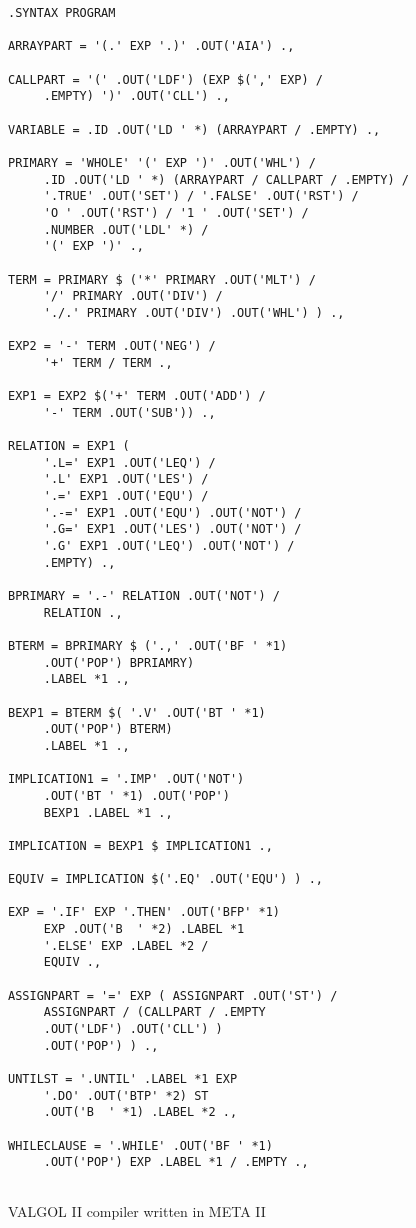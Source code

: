 \documentclass[notitlepage,twocolumn]{report}
\begin{document}
\begin{figure}
\caption{VALGOL II compiler written in META II}
\begin{verbatim}
.SYNTAX PROGRAM

ARRAYPART = '(.' EXP '.)' .OUT('AIA') .,

CALLPART = '(' .OUT('LDF') (EXP $(',' EXP) /
     .EMPTY) ')' .OUT('CLL') .,

VARIABLE = .ID .OUT('LD ' *) (ARRAYPART / .EMPTY) .,

PRIMARY = 'WHOLE' '(' EXP ')' .OUT('WHL') /
     .ID .OUT('LD ' *) (ARRAYPART / CALLPART / .EMPTY) /
     '.TRUE' .OUT('SET') / '.FALSE' .OUT('RST') /
     'O ' .OUT('RST') / '1 ' .OUT('SET') /
     .NUMBER .OUT('LDL' *) /
     '(' EXP ')' .,

TERM = PRIMARY $ ('*' PRIMARY .OUT('MLT') /
     '/' PRIMARY .OUT('DIV') /
     './.' PRIMARY .OUT('DIV') .OUT('WHL') ) .,

EXP2 = '-' TERM .OUT('NEG') /
     '+' TERM / TERM .,

EXP1 = EXP2 $('+' TERM .OUT('ADD') /
     '-' TERM .OUT('SUB')) .,

RELATION = EXP1 (
     '.L=' EXP1 .OUT('LEQ') /
     '.L' EXP1 .OUT('LES') /
     '.=' EXP1 .OUT('EQU') /
     '.-=' EXP1 .OUT('EQU') .OUT('NOT') /
     '.G=' EXP1 .OUT('LES') .OUT('NOT') /
     '.G' EXP1 .OUT('LEQ') .OUT('NOT') /
     .EMPTY) .,

BPRIMARY = '.-' RELATION .OUT('NOT') /
     RELATION .,

BTERM = BPRIMARY $ ('.,' .OUT('BF ' *1)
     .OUT('POP') BPRIAMRY)
     .LABEL *1 .,

BEXP1 = BTERM $( '.V' .OUT('BT ' *1)
     .OUT('POP') BTERM)
     .LABEL *1 .,

IMPLICATION1 = '.IMP' .OUT('NOT')
     .OUT('BT ' *1) .OUT('POP')
     BEXP1 .LABEL *1 .,

IMPLICATION = BEXP1 $ IMPLICATION1 .,

EQUIV = IMPLICATION $('.EQ' .OUT('EQU') ) .,

EXP = '.IF' EXP '.THEN' .OUT('BFP' *1)
     EXP .OUT('B  ' *2) .LABEL *1
     '.ELSE' EXP .LABEL *2 /
     EQUIV .,

ASSIGNPART = '=' EXP ( ASSIGNPART .OUT('ST') /
     ASSIGNPART / (CALLPART / .EMPTY
     .OUT('LDF') .OUT('CLL') )
     .OUT('POP') ) .,

UNTILST = '.UNTIL' .LABEL *1 EXP
     '.DO' .OUT('BTP' *2) ST
     .OUT('B  ' *1) .LABEL *2 .,

WHILECLAUSE = '.WHILE' .OUT('BF ' *1)
     .OUT('POP') EXP .LABEL *1 / .EMPTY .,


\end{verbatim}
\end{figure}
\end{document}
